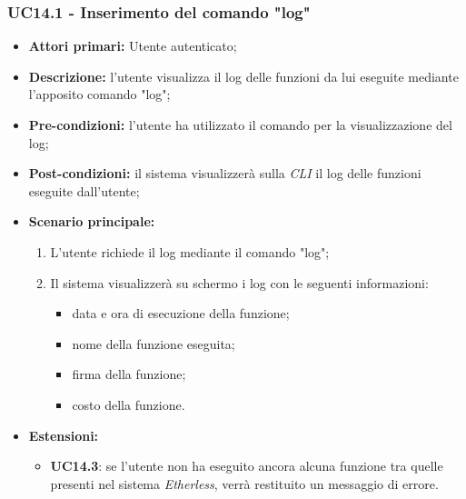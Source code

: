\subsubsection{UC14.1 - Inserimento del comando "log"}
\begin{itemize}
	\item \textbf{Attori primari:} Utente autenticato;
	\item \textbf{Descrizione:} l'utente visualizza il log delle funzioni da lui eseguite mediante l'apposito comando "log"; 
	\item \textbf{Pre-condizioni:} l'utente ha utilizzato il comando per la visualizzazione del log;
	\item \textbf{Post-condizioni:} il sistema visualizzerà sulla \textit{CLI\glo} il log delle funzioni eseguite dall'utente;
	\item \textbf{Scenario principale:} 
	\begin{enumerate}
		\item L'utente richiede il log mediante il comando "log";
		\item Il sistema visualizzerà su schermo i log con le seguenti informazioni:
		\begin{itemize}
			\item data e ora di esecuzione della funzione;
			\item nome della funzione eseguita;
			\item firma della funzione;
			\item costo della funzione.
		\end{itemize}
	\end{enumerate}
	\item \textbf{Estensioni:}
	\begin{itemize}
		\item \textbf{UC14.3}: se l'utente non ha eseguito ancora alcuna funzione tra quelle presenti nel sistema \textit{Etherless\glos}, verrà restituito un messaggio di errore.
	\end{itemize}
\end{itemize}